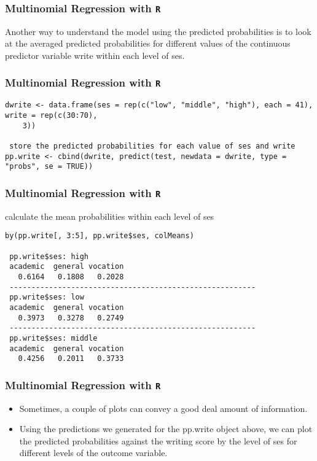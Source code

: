\documentclass[00-GLMregslides.tex]{subfiles}
\begin{document}
\begin{frame}[fragile]

\frametitle{Multinomial Regression with \texttt{R}}
\Large
Another way to understand the model using the predicted probabilities is to look at the averaged predicted probabilities for different values 
of the continuous predictor variable write within each level of ses.
 
\end{frame}
\begin{frame}[fragile]

\frametitle{Multinomial Regression with \texttt{R}}
\Large
\begin{verbatim}
dwrite <- data.frame(ses = rep(c("low", "middle", "high"), each = 41), write = rep(c(30:70),
    3))

 store the predicted probabilities for each value of ses and write
pp.write <- cbind(dwrite, predict(test, newdata = dwrite, type = "probs", se = TRUE))
\end{verbatim}
\end{frame}
\begin{frame}[fragile]

\frametitle{Multinomial Regression with \texttt{R}}
\Large
 calculate the mean probabilities within each level of ses
\begin{verbatim}
by(pp.write[, 3:5], pp.write$ses, colMeans)
 
 pp.write$ses: high
 academic  general vocation 
   0.6164   0.1808   0.2028 
 -------------------------------------------------------- 
 pp.write$ses: low
 academic  general vocation 
   0.3973   0.3278   0.2749 
 -------------------------------------------------------- 
 pp.write$ses: middle
 academic  general vocation 
   0.4256   0.2011   0.3733
\end{verbatim}
\end{frame}
\begin{frame}[fragile]

\frametitle{Multinomial Regression with \texttt{R}}
\Large
\begin{itemize}
\item Sometimes, a couple of plots can convey a good deal amount of information. 
\item Using the predictions we generated for the pp.write object above, we can plot the predicted probabilities against the writing score by the level 
of ses for different levels of the outcome variable.
\end{itemize} 
\end{frame}
\end{document}
